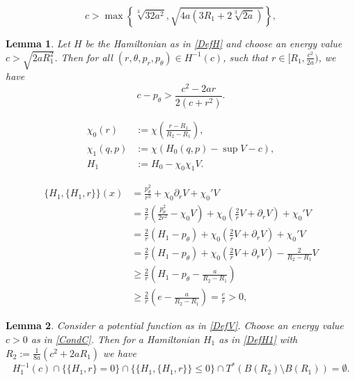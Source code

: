 \documentclass[10pt,a4paper]{amsart}
\newtheorem{lem}{Lemma}
\begin{document}
\begin{equation}\label{CondC}
c> \max\left\lbrace \sqrt[3]{32a^2}, \sqrt{4a\left(3 R_1+2\sqrt[3]{2a}\right)}\right\rbrace,
\end{equation}

\begin{lem}\label{lem:energy}
Let $H$ be the Hamiltonian as in \eqref{DefH} and choose an energy value $c> \sqrt{2aR_1^2} $. Then for all $(r,\theta, p_r, p_\theta)\in H^{-1}(c)$, such that $r\in [R_1, \frac{c^2}{2a})$, we have
$$
c-p_\theta>\frac{c^2-2ar}{2(c+r^2)}.
$$
\end{lem}

\begin{align}
\chi_0(r) & :=\chi \left(\frac{r-R_1}{R_2-R_1}\right), \label{DefChi0}\\
\chi_1(q,p) & := \chi(H_0(q,p)-\sup V-c),\label{DefChi1}\\
H_1 &:= H_0 - \chi_0\chi_1 V.\label{DefH1}
\end{align}

\begin{align}
\{H_1, \{H_1, r\}\}(x) & =\frac{p_\theta^2}{r^3}+\chi_0\partial_rV+\chi_0' V\nonumber \\
& = \frac{2}{r}\left( \frac{p_\theta^2}{2r^2}-\chi_0 V\right)+\chi_0\left( \frac{2}{r}V+ \partial_rV\right)+\chi_0' V\nonumber\\
& = \frac{2}{r}(H_1-p_\theta)+\chi_0\left( \frac{2}{r}V+ \partial_rV\right)+\chi_0' V\nonumber\\
& = \frac{2}{r}(H_1-p_\theta)+\chi_0\left( \frac{2}{r}V+ \partial_rV\right)-\frac{2}{R_2-R_1} V\nonumber\\
& \geq  \frac{2}{r}\left( H_1-p_\theta-\frac{a}{R_2-R_1}\right)\label{H1H1r}\\
& \geq \frac{2}{r}\left( e-\frac{a}{R_2-R_1}\right)=\frac{e}{r}>0,\nonumber
\end{align}

\begin{lem}\label{lem:noMax}
Consider a potential function as in \eqref{DefV}. Choose an energy value $c> 0$ as in \eqref{CondC}.
Then for a Hamiltonian $H_1$ as in \eqref{DefH1} with $R_2:= \frac{1}{8a}\left( c^2+2aR_1\right)$ we have
$$
H_1^{-1}(c)\cap\{\{H_1,r\}=0\}\cap \{\{H_1,\{H_1,r\}\}\leq 0\}\cap T^*(B(R_2)\setminus B(R_1))=\emptyset.
$$
\end{lem}
\end{document}
